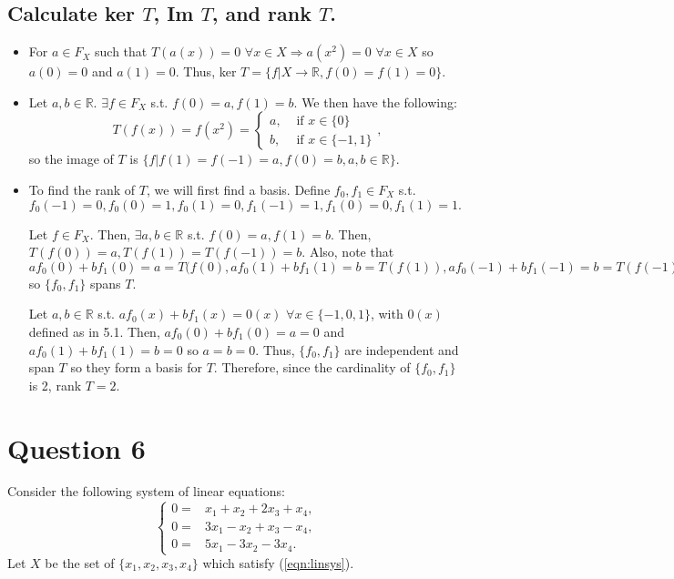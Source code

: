\documentclass[11pt]{article} %
\begin{document}
\subsection{Calculate ker $T$, Im $T$, and rank $T$.}
\begin{itemize}
\item
For $a \in F_X$ such that $T(a(x)) = 0$ $\forall x \in X \Rightarrow a(x^2) = 0$ $\forall x \in X$ so  $a(0) = 0$ and $a(1) = 0.$ Thus, ker $ T = \{f|X \rightarrow \mathbb{R}, f(0) = f(1) = 0\}$.
\item
Let $a,b \in \mathbb{R}.$ $\exists f \in F_X$ s.t. $f(0) = a, f(1) = b$. We then have the following:
\begin{equation*}
T(f(x)) = f(x^2) = 
\begin{cases}
a,& \text{ if } x \in \{ 0\} \\
b,& \text{ if } x \in \{ -1,1\}
\end{cases},
\end{equation*} 
so the image of $T$ is $\{ f| f(1) = f(-1) = a, f(0) = b, a,b \in \mathbb{R}\}$.
\item
To find the rank of $T$, we will first find a basis. Define $f_0,f_1 \in F_X$ s.t. $f_0(-1) = 0, f_0(0) = 1, f_0(1) = 0,f_1(-1) = 1, f_1(0) = 0, f_1(1) = 1.$

Let $f \in F_X.$ Then, $\exists a,b \in \mathbb{R}$ s.t. $f(0) = a,f(1) = b.$ Then, $T(f(0)) = a, T(f(1)) = T(f(-1)) = b.$ Also, note that $af_0(0) +bf_1(0) = a = T(f(0), af_0(1) +bf_1(1) = b = T(f(1)), af_0(-1) + bf_1(-1) = b = T(f(-1)) $ so $\{ f_0,f_1\}$ spans $T.$ 

Let $a,b \in \mathbb{R}$ s.t. $af_0(x) + bf_1(x) = 0(x)$ $\forall x \in \{-1,0,1\}$, with $0(x)$ defined as in 5.1. Then, $af_0(0) + bf_1(0) = a = 0$ and $af_0(1) + bf_1(1) = b = 0$ so $a=b=0.$ Thus, $\{ f_0,f_1\}$ are independent and span $T$ so they form a basis for $T$. Therefore, since the cardinality of $\{ f_0,f_1\}$ is 2, rank $T = 2.$
 
\end{itemize}
\section{Question 6}
Consider the following system of linear equations:
\begin{equation}
\begin{cases}
0=& x_1 + x_2 + 2x_3 + x_4, \\
0=&3x_1 - x_2 + x_3 - x_4, \\
0=&5x_1 - 3x_2 - 3x_4. \label{eqn:linsys}
\end{cases}
\end{equation}
Let $X$ be the set of $\{ x_1,x_2,x_3,x_4 \}$ which satisfy (\ref{eqn:linsys}).
\end{document}
